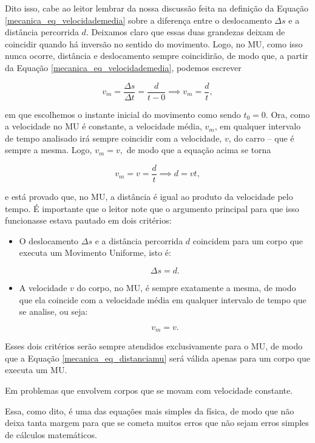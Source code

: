 Dito isso, cabe ao leitor lembrar da nossa discussão feita na definição da Equação \eqref{mecanica_eq_velocidademedia} sobre a diferença entre o deslocamento $\Delta s$ e a distância percorrida $d$. Deixamos claro que essas duas grandezas deixam de coincidir quando há inversão no sentido do movimento. Logo, no MU, como isso nunca ocorre, distância e deslocamento sempre coincidirão, de modo que, a partir da Equação \eqref{mecanica_eq_velocidademedia}, podemos escrever

$$ v_m = \dfrac{\Delta s}{\Delta t} = \dfrac{d}{t-0} \implies v_m = \dfrac{d}{t},$$

\noindent em que escolhemos o instante inicial do movimento como sendo $t_0=0.$ Ora, como a velocidade no MU é constante, a velocidade média, $v_m$, em qualquer intervalo de tempo analisado irá sempre coincidir com a velocidade, $v$, do carro -- que é sempre a mesma. Logo, $v_m=v,$ de modo que a equação acima se torna

$$ v_m=v=\dfrac{d}{t} \implies \boxed{ d=vt,}$$

\noindent e está provado que, no MU, a distância é igual ao produto da velocidade pelo tempo. É importante que o leitor note que o argumento principal para que isso funcionasse estava pautado em dois critérios:

\begin{itemize}
    \item [(i)] O deslocamento $\Delta s$ e a distância percorrida $d$ coincidem para um corpo que executa um Movimento Uniforme, isto é:

    $$\Delta s = d.$$

    \item [(ii)] A velocidade $v$ do corpo, no MU, é sempre exatamente a mesma, de modo que ela coincide com a velocidade média em qualquer intervalo de tempo que se analise, ou seja:

    $$ v_m = v.$$
\end{itemize}

Esses dois critérios serão sempre atendidos exclusivamente para o MU, de modo que a Equação \eqref{mecanica_eq_distanciamu} será válida apenas para um corpo que executa um MU.



Em problemas que envolvem corpos que se movam com velocidade constante.




Essa, como dito, é uma das equações mais simples da física, de modo que não deixa tanta margem para que se cometa muitos erros que não sejam erros simples de cálculos matemáticos.

